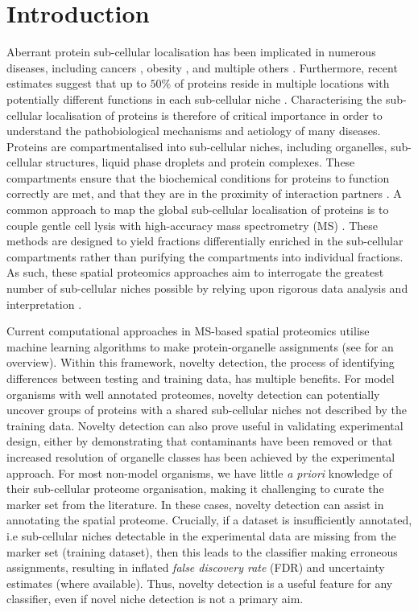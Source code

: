 \documentclass[12pt,english]{article}
\begin{document}
\section{Introduction}
Aberrant protein sub-cellular localisation has been implicated in numerous diseases, including cancers \citep{Kau:2004}, obesity \citep{Siljee:2018}, and multiple others \citep{Laurila:2009}. Furthermore, recent estimates suggest that up to $50\%$ of proteins reside in multiple locations with potentially different functions in each sub-cellular niche \citep{hyper, Thul:2017}. Characterising the sub-cellular localisation of proteins is therefore of critical importance in order to understand the pathobiological mechanisms and aetiology of many diseases. Proteins are compartmentalised into sub-cellular niches, including organelles, sub-cellular structures, liquid phase droplets and protein complexes. These compartments ensure that the biochemical conditions for proteins to function correctly are met, and that they are in the proximity of interaction partners \citep{Gibson:2009}. A common approach to map the global sub-cellular localisation of proteins is to couple gentle cell lysis with high-accuracy mass spectrometry (MS) \citep{hyper, Mulvey:2017, DC:2018, Orre:2019}. These methods are designed to yield fractions differentially enriched in the sub-cellular compartments rather than purifying the compartments into individual fractions. As such, these spatial proteomics approaches aim to interrogate the greatest number of sub-cellular niches possible by relying upon rigorous data analysis and interpretation \citep{Gatto:2010, Gatto:2014b}.

Current computational approaches in MS-based spatial proteomics utilise machine learning algorithms to make protein-organelle assignments (see \cite{Gatto:2014b} for an overview). Within this framework, novelty detection, the process of identifying differences between testing and training data, has multiple benefits. For model organisms with well annotated proteomes, novelty detection can potentially uncover groups of proteins with a shared sub-cellular niches not described by the training data. Novelty detection can also prove useful in validating experimental design, either by demonstrating that contaminants have been removed or that increased resolution of organelle classes has been achieved by the experimental approach. For most non-model organisms, we have little \textit{a priori} knowledge of their sub-cellular proteome organisation, making it challenging to curate the marker set from the literature. In these cases, novelty detection can assist in annotating the spatial proteome.  Crucially, if a dataset is insufficiently annotated, i.e sub-cellular niches detectable in the experimental data are missing from the marker set (training dataset), then this leads to the classifier making erroneous assignments, resulting in inflated \textit{false discovery rate} (FDR) and uncertainty estimates (where available). Thus, novelty detection is a useful feature for any classifier, even if novel niche detection is not a primary aim.
\end{document}
